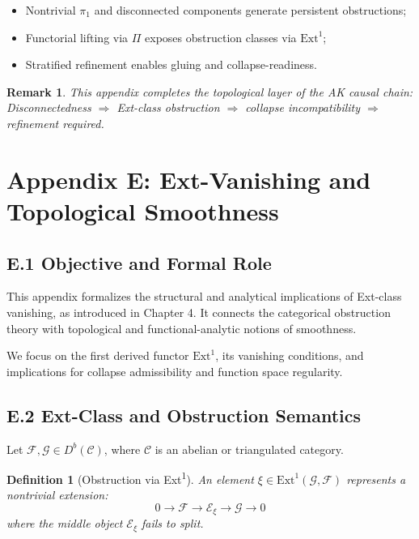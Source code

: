 \documentclass[11pt]{article}
\newtheorem{definition}[theorem]{Definition}
\newtheorem{remark}[theorem]{Remark}
\begin{document}
\begin{itemize}
  \item Nontrivial \(\pi_1\) and disconnected components generate persistent obstructions;
  \item Functorial lifting via \(\Pi\) exposes obstruction classes via \(\mathrm{Ext}^1\);
  \item Stratified refinement enables gluing and collapse-readiness.
\end{itemize}

\begin{remark}
This appendix completes the topological layer of the AK causal chain:  
Disconnectedness \(\Rightarrow\) Ext-class obstruction \(\Rightarrow\) collapse incompatibility \(\Rightarrow\) refinement required.
\end{remark}



\section*{Appendix E: Ext-Vanishing and Topological Smoothness}

\subsection*{E.1 Objective and Formal Role}

This appendix formalizes the structural and analytical implications of Ext-class vanishing,  
as introduced in Chapter 4. It connects the categorical obstruction theory  
with topological and functional-analytic notions of smoothness.

We focus on the first derived functor \( \mathrm{Ext}^1 \), its vanishing conditions, and implications  
for collapse admissibility and function space regularity.

\subsection*{E.2 Ext-Class and Obstruction Semantics}

Let \( \mathcal{F}, \mathcal{G} \in D^b(\mathcal{C}) \), where \( \mathcal{C} \) is an abelian or triangulated category.

\begin{definition}[Obstruction via Ext\textsuperscript{1}]
An element \( \xi \in \mathrm{Ext}^1(\mathcal{G}, \mathcal{F}) \) represents a nontrivial extension:
\[
0 \to \mathcal{F} \to \mathcal{E}_\xi \to \mathcal{G} \to 0
\]
where the middle object \( \mathcal{E}_\xi \) fails to split.
\end{definition}
\end{document}
